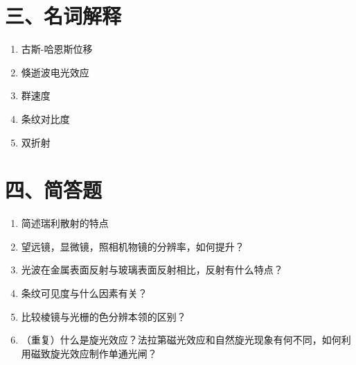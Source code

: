 \documentclass[12pt, a4paper]{article}
\theoremstyle{solution}
\begin{document}
\section*{三、名词解释}
\begin{enumerate}
    \item 古斯-哈恩斯位移
    \item 倏逝波电光效应
    \item 群速度
    \item 条纹对比度
    \item 双折射
\end{enumerate}
\section*{四、简答题}
\begin{enumerate}
    \item 简述瑞利散射的特点
    \item 望远镜，显微镜，照相机物镜的分辨率，如何提升？
    \item 光波在金属表面反射与玻璃表面反射相比，反射有什么特点？
    \item 条纹可见度与什么因素有关？
    \item 比较棱镜与光栅的色分辨本领的区别？
    \item （重复）什么是旋光效应？法拉第磁光效应和自然旋光现象有何不同，如何利用磁致旋光效应制作单通光闸？
\end{enumerate}
\end{document}
